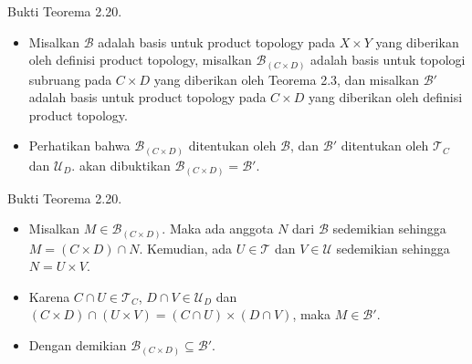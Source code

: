     \begin{frame}{Bukti Teorema 2.20.}
    \begin{tcolorbox}[title=Bukti Teorema 2.20 (1/3)]
    \begin{itemize}
        \item Misalkan $\mathcal{B}$ adalah basis untuk product topology pada $X \times Y$ yang diberikan oleh definisi product topology, misalkan $\mathcal{B}_{(C \times D)}$ adalah basis untuk topologi subruang pada $C \times D$ yang diberikan oleh Teorema 2.3, dan misalkan $\mathcal{B}'$ adalah basis untuk product topology pada $C \times D$ yang diberikan oleh definisi product topology. 
        \item Perhatikan bahwa $\mathcal{B}_{(C \times D)}$ ditentukan oleh $\mathcal{B}$, dan $\mathcal{B}'$ ditentukan oleh $\mathcal{T}_C$ dan $\mathcal{U}_D$. akan dibuktikan $\mathcal{B}_{(C \times D)} = \mathcal{B}'$.
    \end{itemize}
    
    \end{tcolorbox}
    \end{frame}
    
    \begin{frame}{Bukti Teorema 2.20.}
    \begin{tcolorbox}[title=Bukti Teorema 2.20 (2/3)]
    \begin{itemize}
        \item Misalkan $M \in \mathcal{B}_{(C \times D)}$. Maka ada anggota $N$ dari $\mathcal{B}$ sedemikian sehingga $M = (C \times D) \cap N$. Kemudian, ada $U \in \mathcal{T}$ dan $V \in \mathcal{U}$ sedemikian sehingga $N = U \times V$.
        \item Karena $C \cap U \in \mathcal{T}_C$, $D \cap V \in \mathcal{U}_D$ dan $(C \times D) \cap (U \times V) = (C \cap U) \times (D \cap V)$, maka $M \in \mathcal{B}'$.
        \item Dengan demikian $\mathcal{B}_{(C \times D)} \subseteq \mathcal{B}'$.
    \end{itemize}
    
    \end{tcolorbox}
    \end{frame}
    
